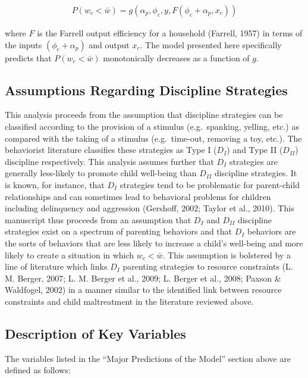 \documentclass[]{elsarticle}
\begin{document}
\begin{align}\label{eqn:prediction}
P(w_c < \bar{w})=g(\alpha_p, \phi_c, y, F(\phi_c + \alpha_p, x_c))
\end{align}

where $F$ is the Farrell output efficiency for a household (Farrell,
1957) in terms of the inputs $(\phi_c + \alpha_p)$ and output $x_c$. The
model presented here specifically predicts that $P(w_c < \bar{w})$
monotonically decreases as a function of $g$.

\subsection{Assumptions Regarding Discipline
Strategies}\label{assumptions-regarding-discipline-strategies}

This analysis proceeds from the assumption that discipline strategies
can be classified according to the provision of a stimulus
(e.g.~spanking, yelling, etc.) as compared with the taking of a stimulus
(e.g.~time-out, removing a toy, etc.). The behaviorist literature
classifies these strategies as Type I ($D_I$) and Type II ($D_{II}$)
discipline respectively. This analysis assumes further that $D_I$
strategies are generally less-likely to promote child well-being than
$D_{II}$ discipline strategies. It is known, for instance, that $D_I$
strategies tend to be problematic for parent-child relationships and can
sometimes lead to behavioral problems for children including delinquency
and aggression (Gershoff, 2002; Taylor et al., 2010). This manuscript
thus proceeds from an assumption that $D_I$ and $D_{II}$ discipline
strategies exist on a spectrum of parenting behaviors and that $D_I$
behaviors are the sorts of behaviors that are less likely to increase a
child's well-being and more likely to create a situation in which
$w_c < \bar{w}$. This assumption is bolstered by a line of literature
which links $D_I$ parenting strategies to resource constraints (L. M.
Berger, 2007; L. M. Berger et al., 2009; L. Berger et al., 2008; Paxson
\& Waldfogel, 2002) in a manner similar to the identified link between
resource constraints and child maltreatment in the literature reviewed
above.

\subsection{Description of Key
Variables}\label{description-of-key-variables}

The variables listed in the ``Major Predictions of the Model'' section
above are defined as follows:
\end{document}
